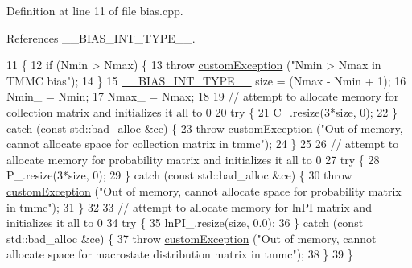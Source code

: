 Definition at line 11 of file bias.\+cpp.



References \+\_\+\+\_\+\+B\+I\+A\+S\+\_\+\+I\+N\+T\+\_\+\+T\+Y\+P\+E\+\_\+\+\_\+.


\begin{DoxyCode}
11                                           \{     
12                 \textcolor{keywordflow}{if} (Nmin > Nmax) \{
13                                 \textcolor{keywordflow}{throw} \hyperlink{classcustom_exception}{customException} (\textcolor{stringliteral}{"Nmin > Nmax in TMMC bias"});
14                 \}
15                 \hyperlink{bias_8h_a1ceb524363fcb94da0c64d297ea27438}{\_\_BIAS\_INT\_TYPE\_\_} size = (Nmax - Nmin + 1);
16                 Nmin\_ = Nmin;
17                 Nmax\_ = Nmax;
18                 
19                 \textcolor{comment}{// attempt to allocate memory for collection matrix and initializes it all to 0}
20                 \textcolor{keywordflow}{try} \{
21                                 C\_.resize(3*size, 0);
22                 \} \textcolor{keywordflow}{catch} (\textcolor{keyword}{const} std::bad\_alloc &ce) \{
23                                 \textcolor{keywordflow}{throw} \hyperlink{classcustom_exception}{customException} (\textcolor{stringliteral}{"Out of memory, cannot allocate space
       for collection matrix in tmmc"});
24                 \}
25 
26                 \textcolor{comment}{// attempt to allocate memory for probability matrix and initializes it all to 0}
27                 \textcolor{keywordflow}{try} \{
28                                 P\_.resize(3*size, 0);
29                 \} \textcolor{keywordflow}{catch} (\textcolor{keyword}{const} std::bad\_alloc &ce) \{
30                                 \textcolor{keywordflow}{throw} \hyperlink{classcustom_exception}{customException} (\textcolor{stringliteral}{"Out of memory, cannot allocate space
       for probability matrix in tmmc"});
31                 \}
32                 
33                 \textcolor{comment}{// attempt to allocate memory for lnPI matrix and initializes it all to 0}
34                 \textcolor{keywordflow}{try} \{
35                                 lnPI\_.resize(size, 0.0);
36                 \} \textcolor{keywordflow}{catch} (\textcolor{keyword}{const} std::bad\_alloc &ce) \{
37                                 \textcolor{keywordflow}{throw} \hyperlink{classcustom_exception}{customException} (\textcolor{stringliteral}{"Out of memory, cannot allocate space
       for macrostate distribution matrix in tmmc"});
38                 \}
39 \}
\end{DoxyCode}


